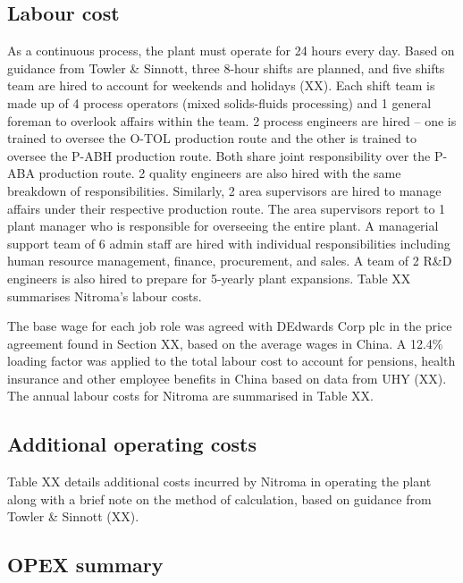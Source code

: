 \subsection{Labour cost}
As a continuous process, the plant must operate for 24 hours every day. Based on guidance from Towler \& Sinnott, three 8-hour shifts are planned, and five shifts team are hired to account for weekends and holidays (XX). Each shift team is made up of 4 process operators (mixed solids-fluids processing) and 1 general foreman to overlook affairs within the team. 2 process engineers are hired – one is trained to oversee the O-TOL production route and the other is trained to oversee the P-ABH production route. Both share joint responsibility over the P-ABA production route. 2 quality engineers are also hired with the same breakdown of responsibilities.  Similarly, 2 area supervisors are hired to manage affairs under their respective production route. The area supervisors report to 1 plant manager who is responsible for overseeing the entire plant. A managerial support team of 6 admin staff are hired with individual responsibilities including human resource management, finance, procurement, and sales. A team of 2 R\&D engineers is also hired to prepare for 5-yearly plant expansions. Table XX summarises Nitroma's labour costs.

The base wage for each job role was agreed with DEdwards Corp plc in the price agreement found in Section XX, based on the average wages in China. A 12.4\% loading factor was applied to the total labour cost to account for pensions, health insurance and other employee benefits in China based on data from UHY (XX). The annual labour costs for Nitroma are summarised in Table XX.

\subsection{Additional operating costs}
Table XX details additional costs incurred by Nitroma in operating the plant along with a brief note on the method of calculation, based on guidance from Towler \& Sinnott (XX).

\subsection{OPEX summary}